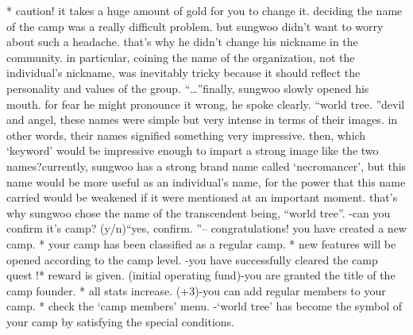 * caution! it takes a huge amount of gold for you to change it.
deciding the name of the camp was a really difficult problem.
 but sungwoo didn’t want to worry about such a headache.
 that’s why he didn’t change his nickname in the community.
in particular, coining the name of the organization, not the individual’s nickname, was inevitably tricky because it should reflect the personality and values of the group.
“…”finally, sungwoo slowly opened his mouth.
 for fear he might pronounce it wrong, he spoke clearly.
“world tree.
”devil and angel, these names were simple but very intense in terms of their images.
in other words, their names signified something very impressive.
then, which ‘keyword’ would be impressive enough to impart a strong image like the two names?currently, sungwoo has a strong brand name called ‘necromancer’, but this name would be more useful as an individual’s name, for the power that this name carried would be weakened if it were mentioned at an important moment.
that’s why sungwoo chose the name of the transcendent being, “world tree”.
-can you confirm it’s  camp? (y/n)“yes, confirm.
”– congratulations! you have created a new camp.
* your camp has been classified as a regular camp.
* new features will be opened according to the camp level.
-you have successfully cleared the camp quest !* reward is given.
 (initial operating fund)-you are granted the title of the camp founder.
* all stats increase.
 (+3)-you can add regular members to your camp.
* check the ‘camp members’ menu.
-‘world tree’ has become the symbol of your camp by satisfying the special conditions.

